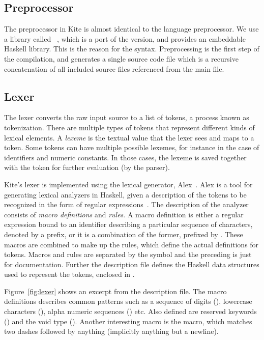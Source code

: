 
\subsection{Preprocessor}
The preprocessor in Kite is almost identical to the  language preprocessor. We use a library called ~\cite{wallace04}, which is a port of the  version, and provides an embeddable Haskell library. This is the reason for the  syntax. Preprocessing is the first step of the compilation, and generates a single source code file which is a recursive concatenation of all included source files referenced from the main file.


\subsection{Lexer}
\label{sec:impl-lexer}
The lexer converts the raw input source to a list of tokens, a process known as tokenization. There are multiple types of tokens that represent different kinds of lexical elements. A \emph{lexeme} is the textual value that the lexer sees and maps to a token. Some tokens can have multiple possible lexemes, for instance in the case of identifiers and numeric constants. In those cases, the lexeme is saved together with the token for further evaluation (by the parser).

Kite's lexer is implemented using the lexical generator, Alex~\cite{dornan01}. Alex is a tool for generating lexical analyzers in Haskell, given a description of the tokens to be recognized in the form of regular expressions~\cite[p. 4]{dornan01}. The description of the analyzer consists of \emph{macro definitions} and \emph{rules}. A macro definition is either a regular expression bound to an identifier describing a particular sequence of characters, denoted by a \code{\$} prefix, or it is a combination of the former, prefixed by . These macros are combined to make up the rules, which define the actual definitions for tokens. Macros and rules are separated by the symbol \code{:-} and the preceding  is just for documentation\cite[p. 7]{dornan01}. Further the description file defines the Haskell data structures used to represent the tokens, enclosed in \code{\{ \}}.

Figure~\ref{fig:lexer} shows an excerpt from the description file. The macro definitions describes common patterns such as a sequence of digits (), lowercase characters (), alpha numeric sequences () etc. Also defined are reserved keywords (\code{\@keywords}) and the void type (). Another interesting macro is the  macro, which matches two dashes followed by anything (implicitly anything but a newline).

